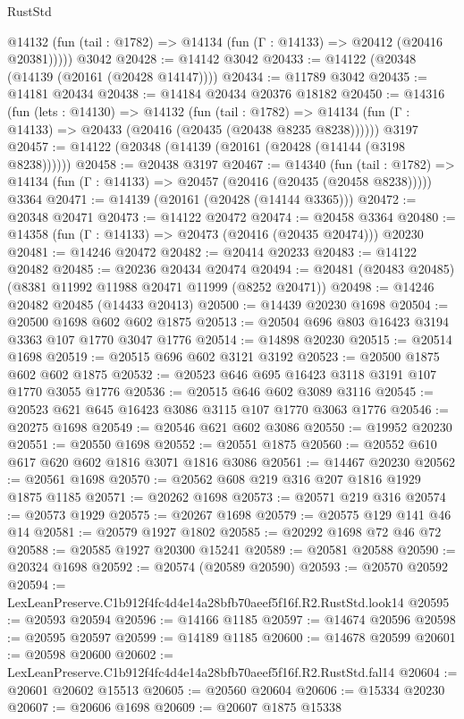 \begin{lexlean}{RustStd}
\begin{coremodule}
      @14132 (fun (tail : @1782) => @14134 (fun (Γ : @14133) => @20412 (@20416 @20381)))))
    @3042
@20428 := @14142 @3042
@20433 := @14122 (@20348 (@14139 (@20161 (@20428 @14147))))
@20434 := @11789 @3042
@20435 := @14181 @20434
@20438 := @14184 @20434 @20376 @18182
@20450 := @14316
    (fun (lets : @14130) =>
    @14132
      (fun (tail : @1782) =>
      @14134 (fun (Γ : @14133) => @20433 (@20416 (@20435 (@20438 @8235 @8238))))))
    @3197
@20457 := @14122 (@20348 (@14139 (@20161 (@20428 (@14144 (@3198 @8238))))))
@20458 := @20438 @3197
@20467 := @14340
    (fun (tail : @1782) => @14134 (fun (Γ : @14133) => @20457 (@20416 (@20435 (@20458 @8238)))))
    @3364
@20471 := @14139 (@20161 (@20428 (@14144 @3365)))
@20472 := @20348 @20471
@20473 := @14122 @20472
@20474 := @20458 @3364
@20480 := @14358 (fun (Γ : @14133) => @20473 (@20416 (@20435 @20474))) @20230
@20481 := @14246 @20472
@20482 := @20414 @20233
@20483 := @14122 @20482
@20485 := @20236 @20434 @20474
@20494 := @20481 (@20483 @20485) (@8381 @11992 @11988 @20471 @11999 (@8252 @20471))
@20498 := @14246 @20482 @20485 (@14433 @20413)
@20500 := @14439 @20230 @1698
@20504 := @20500 @1698 @602 @602 @1875
@20513 := @20504 @696 @803 @16423 @3194 @3363 @107 @1770 @3047 @1776
@20514 := @14898 @20230
@20515 := @20514 @1698
@20519 := @20515 @696 @602 @3121 @3192
@20523 := @20500 @1875 @602 @602 @1875
@20532 := @20523 @646 @695 @16423 @3118 @3191 @107 @1770 @3055 @1776
@20536 := @20515 @646 @602 @3089 @3116
@20545 := @20523 @621 @645 @16423 @3086 @3115 @107 @1770 @3063 @1776
@20546 := @20275 @1698
@20549 := @20546 @621 @602 @3086
@20550 := @19952 @20230
@20551 := @20550 @1698
@20552 := @20551 @1875
@20560 := @20552 @610 @617 @620 @602 @1816 @3071 @1816 @3086
@20561 := @14467 @20230
@20562 := @20561 @1698
@20570 := @20562 @608 @219 @316 @207 @1816 @1929 @1875 @1185
@20571 := @20262 @1698
@20573 := @20571 @219 @316
@20574 := @20573 @1929
@20575 := @20267 @1698
@20579 := @20575 @129 @141 @46 @14
@20581 := @20579 @1927 @1802
@20585 := @20292 @1698 @72 @46 @72
@20588 := @20585 @1927 @20300 @15241
@20589 := @20581 @20588
@20590 := @20324 @1698
@20592 := @20574 (@20589 @20590)
@20593 := @20570 @20592
@20594 := LexLeanPreserve.C1b912f4fc4d4e14a28bfb70aeef5f16f.R2.RustStd.look14
@20595 := @20593 @20594
@20596 := @14166 @1185
@20597 := @14674 @20596
@20598 := @20595 @20597
@20599 := @14189 @1185
@20600 := @14678 @20599
@20601 := @20598 @20600
@20602 := LexLeanPreserve.C1b912f4fc4d4e14a28bfb70aeef5f16f.R2.RustStd.fal14
@20604 := @20601 @20602 @15513
@20605 := @20560 @20604
@20606 := @15334 @20230
@20607 := @20606 @1698
@20609 := @20607 @1875 @15338

\end{coremodule}
\end{lexlean}
